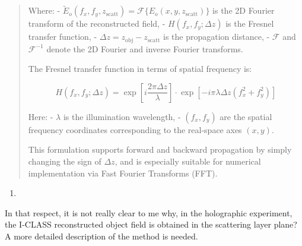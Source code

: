 \documentclass[12pt]{article}
\newenvironment{solved_reviewercomment}
    {\begin{tcolorbox}[width=\linewidth,colback=gray!5,colframe=solved_commentcolor!50,title=Reviewer Comment,left=5pt,right=5pt]}
    {\end{tcolorbox}}
\newenvironment{finished_ourresponse}
    {\begin{tcolorbox}[width=\linewidth,breakable,enhanced,colback=gray!5,colframe=finished_responsecolor!50,title=Response,left=5pt,right=5pt]}
    {\end{tcolorbox}}
\begin{document}
\begin{finished_ourresponse}
\begin{quote}
        Where:
        - $ \tilde{E}_o(f_x, f_y, z_{\text{scatt}}) = \mathcal{F}\{ E_o(x, y, z_{\text{scatt}}) \} $ is the 2D Fourier transform of the reconstructed field,
        - $ H(f_x, f_y; \Delta z) $ is the Fresnel transfer function,
        - $ \Delta z = z_{\text{obj}} - z_{\text{scatt}} $ is the propagation distance,
        - $ \mathcal{F} $ and $ \mathcal{F}^{-1} $ denote the 2D Fourier and inverse Fourier transforms.
        
        The Fresnel transfer function in terms of spatial frequency is:
        
        \begin{equation}
            H(f_x, f_y; \Delta z) = \exp\left[ i \frac{2\pi \Delta z}{\lambda} \right] \cdot \exp\left[ -i \pi \lambda \Delta z (f_x^2 + f_y^2) \right]
        \end{equation}
        
        Here:
        - $ \lambda $ is the illumination wavelength,
        - $ (f_x, f_y) $ are the spatial frequency coordinates corresponding to the real-space axes $ (x, y) $.
        
        This formulation supports forward and backward propagation by simply changing the sign of $ \Delta z $, and is especially suitable for numerical implementation via Fast Fourier Transforms (FFT).
        
    \end{quote}

            
\end{finished_ourresponse}


    
\begin{enumerate}[label=\arabic*., resume]
\item \leavevmode
\end{enumerate}
\vspace{-1em}
\begin{solved_reviewercomment}
    In that respect, it is not really clear to me why, in the holographic experiment, the I-CLASS reconstructed object field is obtained in the scattering layer plane? A more detailed description of the method is needed.
\end{solved_reviewercomment}
\end{document}
